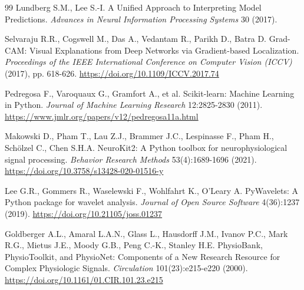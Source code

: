 \documentclass[11pt]{article}
\begin{document}
\begin{thebibliography}{99}
Lundberg S.M., Lee S.-I. A Unified Approach to Interpreting Model Predictions. \textit{Advances in Neural Information Processing Systems} 30 (2017).

Selvaraju R.R., Cogswell M., Das A., Vedantam R., Parikh D., Batra D. Grad-CAM: Visual Explanations from Deep Networks via Gradient-based Localization. \textit{Proceedings of the IEEE International Conference on Computer Vision (ICCV)} (2017), pp. 618-626. \url{https://doi.org/10.1109/ICCV.2017.74}

Pedregosa F., Varoquaux G., Gramfort A., et al. Scikit-learn: Machine Learning in Python. \textit{Journal of Machine Learning Research} 12:2825-2830 (2011). \url{https://www.jmlr.org/papers/v12/pedregosa11a.html}

Makowski D., Pham T., Lau Z.J., Brammer J.C., Lespinasse F., Pham H., Sch\"olzel C., Chen S.H.A. NeuroKit2: A Python toolbox for neurophysiological signal processing. \textit{Behavior Research Methods} 53(4):1689-1696 (2021). \url{https://doi.org/10.3758/s13428-020-01516-y}

Lee G.R., Gommers R., Waselewski F., Wohlfahrt K., O'Leary A. PyWavelets: A Python package for wavelet analysis. \textit{Journal of Open Source Software} 4(36):1237 (2019). \url{https://doi.org/10.21105/joss.01237}

Goldberger A.L., Amaral L.A.N., Glass L., Hausdorff J.M., Ivanov P.C., Mark R.G., Mietus J.E., Moody G.B., Peng C.-K., Stanley H.E. PhysioBank, PhysioToolkit, and PhysioNet: Components of a New Research Resource for Complex Physiologic Signals. \textit{Circulation} 101(23):e215-e220 (2000). \url{https://doi.org/10.1161/01.CIR.101.23.e215}

\end{thebibliography}
\end{document}
